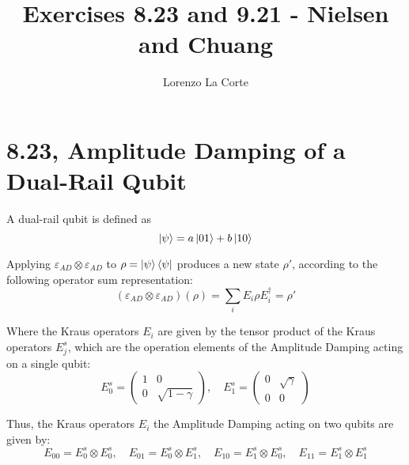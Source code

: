 \documentclass{masterthesis}
\begin{document}
\title{Exercises 8.23 and 9.21 - Nielsen and Chuang}

\author{Lorenzo La Corte}

\advisor{}

\examiner{}

\maketitle

\section*{8.23, Amplitude Damping of a Dual-Rail Qubit}

A dual-rail qubit is defined as
\begin{equation}
    \ket{\psi}=a\ket{01}+b\ket{10}
\end{equation}

Applying $\varepsilon_{A D} \otimes \varepsilon_{A D}$ to $\rho=\ket{\psi}\bra{\psi}$ produces a new state $\rho'$, according to the following operator sum representation:
\begin{equation}
    (\varepsilon_{A D} \otimes \varepsilon_{A D})(\rho) = \sum_{i} E_{i} \rho E_{i}^{\dagger} = \rho'
\end{equation}

Where the Kraus operators $E_{i}$ are given by the tensor product of the Kraus operators $E_{j}^{s}$, which are the operation elements of the Amplitude Damping acting on a single qubit:
\begin{equation}
    E_{0}^{s} = \begin{pmatrix} 1 & 0 \\ 0 & \sqrt{1-\gamma} \end{pmatrix}, \quad E_{1}^{s} = \begin{pmatrix} 0 & \sqrt{\gamma} \\ 0 & 0 \end{pmatrix}
\end{equation}

Thus, the Kraus operators $E_{i}$ the Amplitude Damping acting on two qubits are given by:
\begin{equation}
    E_{00} = E_{0}^{s} \otimes E_{0}^{s}, \quad E_{01} = E_{0}^{s} \otimes E_{1}^{s}, \quad E_{10} = E_{1}^{s} \otimes E_{0}^{s}, \quad E_{11} = E_{1}^{s} \otimes E_{1}^{s}
\end{equation}
\end{document}
